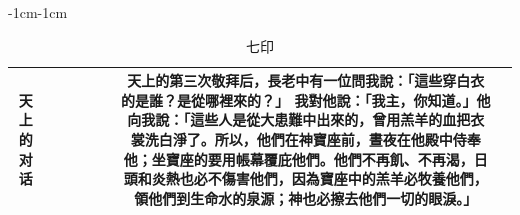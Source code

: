 \begin{changemargin}{-1cm}{-1cm}
\begin{table}
\begin{tabular}{cccccccc}
 \multicolumn{1}{m{.3cm}|}{天上的对话}&
\multicolumn{1}{m{2cm}|}{}  &
\multicolumn{1}{m{2cm}|}{}  &
 \multicolumn{1}{m{2cm}|}{} &
 \multicolumn{1}{m{2cm}|}{}  &
 \multicolumn{1}{m{5cm}|}{}   &
 \multicolumn{1}{m{7.cm}|}{天上的第三次敬拜后，長老中有一位問我說：「這些穿白衣的是誰？是從哪裡來的？」 我對他說：「我主，你知道。」他向我說：「這些人是從大患難中出來的，曾用羔羊的血把衣裳洗白淨了。所以，他們在神寶座前，晝夜在他殿中侍奉他；坐寶座的要用帳幕覆庇他們。他們不再飢、不再渴，日頭和炎熱也必不傷害他們，因為寶座中的羔羊必牧養他們，領他們到生命水的泉源；神也必擦去他們一切的眼淚。」}  &  
 \multicolumn{1}{m{2cm}|}{} \\\hline
\end{tabular}
\caption{七印}
\end{table} 
\end{changemargin}


